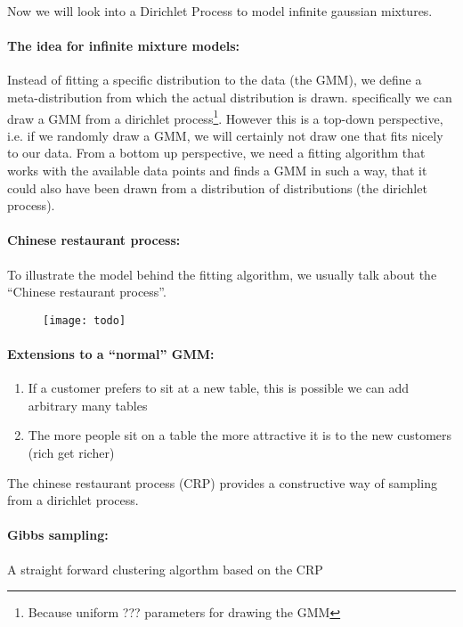 Now we will look into a Dirichlet Process to model infinite gaussian mixtures.

\paragraph{The idea for infinite mixture models:}
Instead of fitting a specific distribution to the data (the GMM), we define a meta-distribution from which the actual distribution is drawn.
specifically we can draw a GMM from a dirichlet process\footnote{Because uniform ??? parameters for drawing the GMM}. However this is a top-down perspective, i.e. if we randomly draw a GMM, we will certainly not draw one that fits nicely to our data.
From a bottom up perspective, we need a fitting algorithm that works with the available data points and finds a GMM in such a way, that it could also have been drawn from a distribution of distributions (the dirichlet process).

\paragraph{Chinese restaurant process:}
To illustrate the model behind the fitting algorithm, we usually talk about the ``Chinese restaurant process''.

\begin{figure}[H]
	\centering
	\texttt{[image: todo]}
\end{figure}

\paragraph{Extensions to a ``normal'' GMM:}
\begin{enumerate}
	\item If a customer prefers to sit at a new table, this is possible we can add arbitrary many tables
	\item The more people sit on a table  the more attractive it is to the new customers (rich get richer)
\end{enumerate}

The chinese restaurant process (CRP) provides a constructive way of sampling from a dirichlet process.

\paragraph{Gibbs sampling:}
A straight forward clustering algorthm based on the CRP

